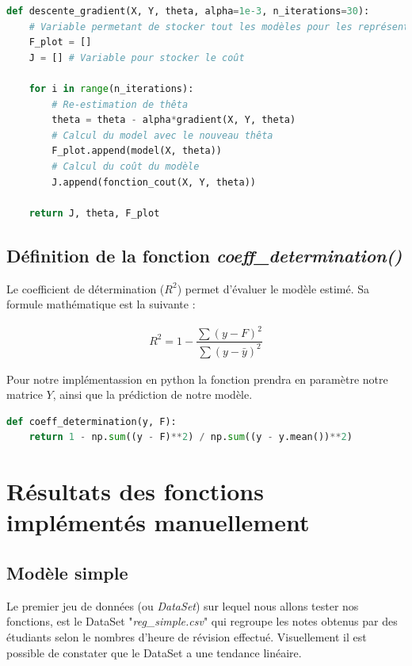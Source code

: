 \documentclass[french]{article}
\begin{document}
\begin{lstlisting}[language=Python]
def descente_gradient(X, Y, theta, alpha=1e-3, n_iterations=30):
    # Variable permetant de stocker tout les modèles pour les représenter facilement
    F_plot = [] 
    J = [] # Variable pour stocker le coût
    
    for i in range(n_iterations):
        # Re-estimation de thêta
        theta = theta - alpha*gradient(X, Y, theta)
        # Calcul du model avec le nouveau thêta
        F_plot.append(model(X, theta)) 
        # Calcul du coût du modèle
        J.append(fonction_cout(X, Y, theta)) 
    
    return J, theta, F_plot
\end{lstlisting}

\subsection{Définition de la fonction \textit{coeff\_determination()}}

\noindent Le coefficient de détermination ($R^{2}$) permet d'évaluer le modèle estimé. Sa formule mathématique est la suivante :

\begin{align*}
    R^{2} = 1 - \dfrac{\sum(y - F)^{2}}{\sum(y - \bar{y})^{2}}
\end{align*}

\noindent Pour notre implémentassion en python la fonction prendra en paramètre notre matrice $Y$, ainsi que la prédiction de notre modèle. 

\begin{lstlisting}[language=Python]
def coeff_determination(y, F):
    return 1 - np.sum((y - F)**2) / np.sum((y - y.mean())**2) 
\end{lstlisting}

\newpage

\section{Résultats des fonctions implémentés manuellement}
\subsection{Modèle simple}

Le premier jeu de données (ou \textit{DataSet}) sur lequel nous allons tester nos fonctions, est le DataSet "\textit{reg\_simple.csv}" qui regroupe les notes obtenus par des étudiants selon le nombres d'heure de révision effectué. Visuellement il est possible de constater que le DataSet a une tendance linéaire.\\
\end{document}

